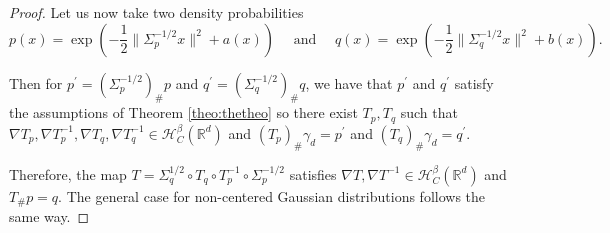 \documentclass{article}
\begin{document}
\begin{proof}
Let us now take two density probabilities
$$p(x)=\exp\left(-\frac{1}{2}\|\Sigma_p^{-1/2}x\|^2+a(x)\right) \quad \text{ and } \quad q(x)=\exp\left(-\frac{1}{2}\|\Sigma_q^{-1/2}x\|^2+b(x)\right).$$

Then for $p^{'}=(\Sigma_p^{-1/2})_{\#} p$ and $q^{'}=(\Sigma_q^{-1/2})_{\#} q$, we have that $p^{'}$ and $q^{'}$ satisfy the assumptions of Theorem \ref{theo:thetheo} so there exist $T_p,T_q$ such that $\nabla T_p,\nabla T_p^{-1},\nabla T_q,\nabla T_q^{-1}\in \mathcal{H}^{\beta}_C   (\mathbb{R}^d)$ and $(T_p)_{\#}\gamma_d =p^{'}$ and $(T_q)_{\#}\gamma_d =q^{'}$.

Therefore, the map $T=\Sigma_q^{1/2}\circ T_q\circ T^{-1}_p\circ \Sigma_p^{-1/2}$ satisfies $\nabla T,\nabla T^{-1}\in  \mathcal{H}^{\beta}_C  (\mathbb{R}^d)$ and $T_{\# }p=q$. The general case for non-centered Gaussian distributions follows the same way.
\end{proof}
\end{document}
